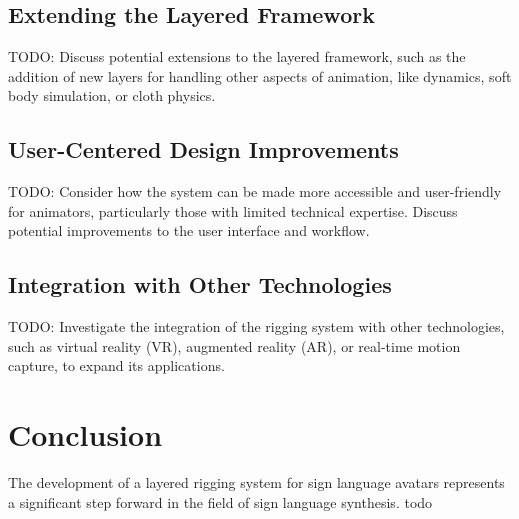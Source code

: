 \documentclass[../../main.tex]{subfiles}
\begin{document}
\subsection{Extending the Layered Framework}
TODO: Discuss potential extensions to the layered framework, such as the addition of new layers for handling other aspects of animation, like dynamics, soft body simulation, or cloth physics.

\subsection{User-Centered Design Improvements}
TODO: Consider how the system can be made more accessible and user-friendly for animators, particularly those with limited technical expertise. Discuss potential improvements to the user interface and workflow.

\subsection{Integration with Other Technologies}
TODO: Investigate the integration of the rigging system with other technologies, such as virtual reality (VR), augmented reality (AR), or real-time motion capture, to expand its applications.

\section{Conclusion}
The development of a layered rigging system for sign language avatars represents a significant step forward in the field of sign language synthesis. todo
\end{document}
